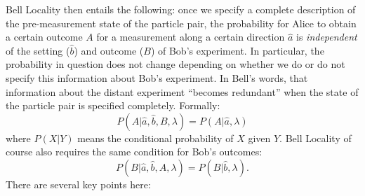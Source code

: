 \documentclass[aps,prc,onecolumn,12pt,nofootinbib]{revtex4-2}
\begin{document}
Bell Locality then entails the following:  once we specify a
complete description of the pre-measurement state of the particle
pair, the probability for Alice to obtain a certain outcome $A$ for a
measurement along a certain direction $\hat{a}$ is \emph{independent}
of the setting ($\hat{b}$) and outcome ($B$) of Bob's experiment.  In
particular, the probability in question does not change depending on
whether we do or do not specify this information about Bob's
experiment.  In Bell's words, that information about the
distant experiment ``becomes redundant'' when the state of the
particle pair is specified completely.
Formally:
\begin{equation}
P(A|\hat{a},\hat{b},B,\lambda) = P(A|\hat{a}, \lambda)
\label{bellloc}
\end{equation}
where $P(X|Y)$ means the conditional probability of $X$ given $Y$.
Bell Locality of course also requires the same condition for Bob's
outcomes:
\begin{equation}
P(B|\hat{a},\hat{b},A,\lambda) = P(B|\hat{b},\lambda).
\label{belllocb}
\end{equation}
There are several key points here:
\end{document}
